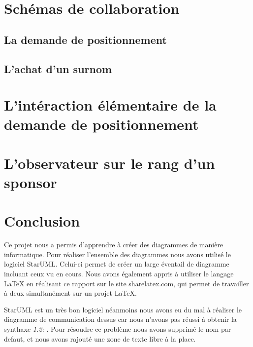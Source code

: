 \documentclass[11pt,a4paper]{article}
\begin{document}

\section{Schémas de collaboration}

\subsection{La demande de positionnement}


\newpage

\subsection{L'achat d'un surnom}

\newpage


\section{L'int\'eraction \'el\'ementaire de la demande de positionnement}


\newpage




\section{L'observateur sur le rang d'un sponsor}

\newpage


\section{Conclusion}
Ce projet nous a permis d'apprendre à créer des diagrammes de manière informatique. Pour réaliser l'ensemble des diagrammes nous avons utilisé le logiciel StarUML. Celui-ci permet de créer un large éventail de diagramme incluant ceux vu en cours. Nous avons également appris à utiliser le langage LaTeX en réalisant ce rapport sur le site sharelatex.com, qui permet de travailler à deux simultanément sur un projet LaTeX.

StarUML est un très bon logiciel néanmoins nous avons eu du mal à réaliser le diagramme de communication dessus car nous n'avons pas réussi à obtenir la synthaxe \textit{1.2:} . Pour résoudre ce problème nous avons supprimé le nom par defaut, et nous avons rajouté une zone de texte libre à la place.
\end{document}
